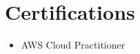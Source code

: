 \documentclass[letterpaper,11pt]{article}
\newcommand{\resumeSubHeadingListStart}{\begin{itemize}[leftmargin=0.0in, label={}]}
\begin{document}
\vspace{-5pt}
  \section{Certifications}
        \begin{multicols}{3}
            \begin{itemize}[itemsep=-5pt, parsep=5pt]
              \item AWS Cloud Practitioner
            \end{itemize}
        \end{multicols}
\vspace*{2.0\multicolsep}


\vspace{-5pt}
\end{document}
